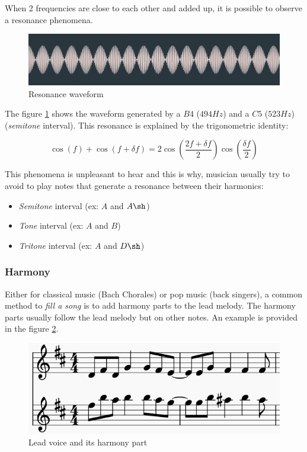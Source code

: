 \documentclass[12pt]{report}
\begin{document}
When 2 frequencies are close to each other and added up, it is possible to observe a resonance phenomena.

\begin{figure}[H]
    \centering
    \includegraphics[width=\textwidth]{images/music/waveform/resonance.jpg}
    \caption{Resonance waveform}
    \label{fig:resonance}
\end{figure}
The figure \ref{fig:resonance} shows the waveform generated by a $B4$ ($494Hz$) and a $C5$ ($523Hz$) (\textit{semitone} interval).
This resonance is explained by the trigonometric identity:

\begin{equation}
    \cos(f) + \cos(f + \delta f) = 2 \cos(\frac{2f + \delta f}{2}) \cos(\frac{\delta f}{2})
\end{equation}

This phenomena is unpleasant to hear and this is why, musician usually try to avoid to play notes that generate a resonance between their harmonics:
\begin{itemize}
    \item \textit{Semitone} interval (ex: $A$ and $A\sh$)
    \item \textit{Tone} interval (ex: $A$ and $B$)
    \item \textit{Tritone} interval (ex: $A$ and $D\sh$)
\end{itemize}


\subsubsection{Harmony}

Either for classical music (Bach Chorales) or pop music (back singers), a common method to \textit{fill a song} is to add harmony parts to the lead melody. The harmony parts usually follow the lead melody but on other notes.
An example is provided in the figure \ref{fig:harmony_example}.

\begin{figure}[H]
    \centering
    \includegraphics[width=0.75 \textwidth]{images/music/stave/harmony.jpg}
    \caption{Lead voice and its harmony part}
    \label{fig:harmony_example}
\end{figure}
\end{document}
